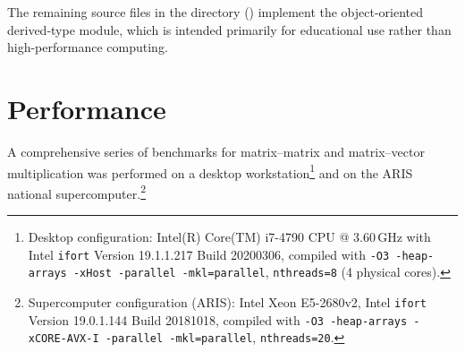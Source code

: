 The remaining source files in the directory () implement the object-oriented derived-type  module, which is intended primarily for educational use rather than high-performance computing.

\section{Performance}
\label{sec:performance}

A comprehensive series of benchmarks for matrix--matrix and matrix--vector multiplication was performed on a desktop workstation\footnote{Desktop configuration: Intel(R) Core(TM) i7-4790 CPU @ 3.60\,GHz with Intel \texttt{ifort} Version 19.1.1.217 Build 20200306, compiled with \texttt{-O3 -heap-arrays -xHost -parallel -mkl=parallel}, \texttt{nthreads=8} (4 physical cores).} and on the ARIS national supercomputer.\footnote{Supercomputer configuration (ARIS): Intel Xeon E5-2680v2, Intel \texttt{ifort} Version 19.0.1.144 Build 20181018, compiled with \texttt{-O3 -heap-arrays -xCORE-AVX-I -parallel -mkl=parallel}, \texttt{nthreads=20}.}

